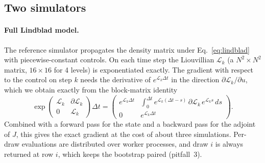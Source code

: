 \documentclass[aps,pra,onecolumn,notitlepage,superscriptaddress,nofootinbib,floatfix]{revtex4-2}
\begin{document}
\subsection{Two simulators}
\label{sec:simulators}
\paragraph*{Full Lindblad model.} The reference simulator propagates the
density matrix under Eq.~\eqref{eq:lindblad} with piecewise-constant
controls. On each time step the Liouvillian $\mathcal L_k$ (a
$N^2\times N^2$ matrix, $16\times16$ for 4 levels) is exponentiated exactly.
The gradient with respect to the control on step $k$ needs the derivative of
$e^{\mathcal L_k\Delta t}$ in the direction $\partial\mathcal L_k/\partial u$,
which we obtain exactly from the block-matrix identity \cite{VanLoan1978}
\begin{equation}
\exp\!\begin{pmatrix}\mathcal L_k & \partial\mathcal L_k\\ 0 & \mathcal L_k\end{pmatrix}\!\Delta t
=\begin{pmatrix}e^{\mathcal L_k\Delta t} & \int_0^{\Delta t}e^{\mathcal L_k(\Delta t-s)}\,\partial\mathcal L_k\,e^{\mathcal L_ks}\,ds\\ 0 & e^{\mathcal L_k\Delta t}\end{pmatrix}.
\label{eq:vanloan}
\end{equation}
Combined with a forward pass for the state and a backward pass for the
adjoint of $J$, this gives the exact gradient at the cost of about three
simulations. Per-draw evaluations are distributed over worker processes, and
draw $i$ is always returned at row $i$, which keeps the bootstrap paired
(pitfall~3).
\end{document}
